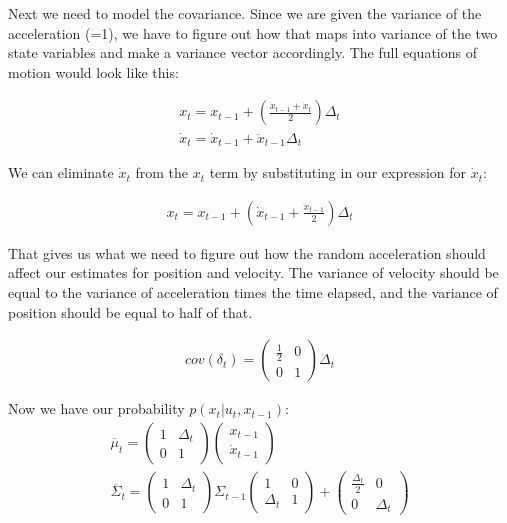 \documentclass[10pt]{article}
\begin{document}
\begin{enumerate}
\begin{enumerate}
  Next we need to model the covariance. Since we are given the variance of the
  acceleration (=1), we have to figure out how that maps into variance of the
  two state variables and make a variance vector accordingly. The full equations
  of motion would look like this:

  \begin{gather}
    x_t = x_{t-1} + \left(\frac{\dot{x}_{t-1} + \dot{x}_t}{2}\right)\Delta_t\\
    \dot{x}_t = \dot{x}_{t-1} + \ddot{x}_{t-1}\Delta_t
  \end{gather}

  We can eliminate $\dot{x}_t$ from the $x_t$ term by substituting in our
  expression for $\dot{x}_t$:

  \begin{gather}
    x_t = x_{t-1} + \left(\dot{x}_{t-1} + \frac{\ddot{x}_{t-1}}{2}\right)\Delta_t
  \end{gather}

  That gives us what we need to figure out how the random acceleration should
  affect our estimates for position and velocity. The variance of velocity
  should be equal to the variance of acceleration times the time elapsed, and
  the variance of position should be equal to half of that. 

  \begin{gather}
  cov(\delta_t) = \begin{pmatrix}\frac{1}{2} & 0 \\ 0 & 1\end{pmatrix}\Delta_t
  \end{gather}

  Now we have our probability $p(x_t | u_t,x_{t-1})$:
  \begin{gather}
  \overline{\mu}_t = \begin{pmatrix}1 & \Delta_t \\ 0 & 1\end{pmatrix}
  \begin{pmatrix}x_{t-1} \\ \dot{x}_{t-1}\end{pmatrix}\\
  \overline{\Sigma}_t = \begin{pmatrix}1 & \Delta_t \\ 0 & 1\end{pmatrix}
    \Sigma_{t-1}
  \begin{pmatrix}1 & 0 \\ \Delta_t & 1\end{pmatrix} + 
  \begin{pmatrix}\frac{\Delta_t}{2} & 0 \\ 0 & \Delta_t\end{pmatrix}
  \end{gather}


\end{enumerate}
\end{enumerate}
\end{document}
